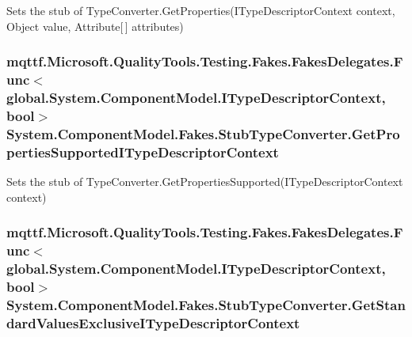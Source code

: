 Sets the stub of Type\-Converter.\-Get\-Properties(\-I\-Type\-Descriptor\-Context context, Object value, Attribute\mbox{[}$\,$\mbox{]} attributes)

\hypertarget{class_system_1_1_component_model_1_1_fakes_1_1_stub_type_converter_aab07fe9794f20706bbe9a69a189f47ee}{
\subsubsection[{Get\-Properties\-Supported\-I\-Type\-Descriptor\-Context}]{\setlength{\rightskip}{0pt plus 5cm}mqttf.\-Microsoft.\-Quality\-Tools.\-Testing.\-Fakes.\-Fakes\-Delegates.\-Func$<$global.\-System.\-Component\-Model.\-I\-Type\-Descriptor\-Context, bool$>$ System.\-Component\-Model.\-Fakes.\-Stub\-Type\-Converter.\-Get\-Properties\-Supported\-I\-Type\-Descriptor\-Context}}\label{class_system_1_1_component_model_1_1_fakes_1_1_stub_type_converter_aab07fe9794f20706bbe9a69a189f47ee}


Sets the stub of Type\-Converter.\-Get\-Properties\-Supported(\-I\-Type\-Descriptor\-Context context)

\hypertarget{class_system_1_1_component_model_1_1_fakes_1_1_stub_type_converter_a7ecd1843d7aa777474b2633c64cebb90}{
\subsubsection[{Get\-Standard\-Values\-Exclusive\-I\-Type\-Descriptor\-Context}]{\setlength{\rightskip}{0pt plus 5cm}mqttf.\-Microsoft.\-Quality\-Tools.\-Testing.\-Fakes.\-Fakes\-Delegates.\-Func$<$global.\-System.\-Component\-Model.\-I\-Type\-Descriptor\-Context, bool$>$ System.\-Component\-Model.\-Fakes.\-Stub\-Type\-Converter.\-Get\-Standard\-Values\-Exclusive\-I\-Type\-Descriptor\-Context}}\label{class_system_1_1_component_model_1_1_fakes_1_1_stub_type_converter_a7ecd1843d7aa777474b2633c64cebb90}



